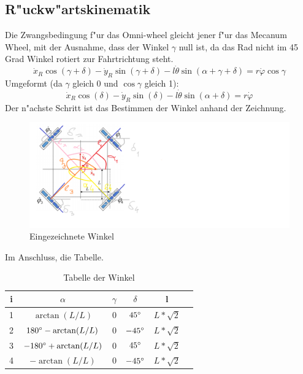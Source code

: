 \documentclass[11pt]{article}
\begin{document}
    \subsection{R"uckw"artskinematik}\label{subsubsec:ruck}
    Die Zwangsbedingung f"ur das Omni-wheel gleicht jener f"ur das Mecanum Wheel, mit der Ausnahme, dass der Winkel $\gamma$ null ist, da das Rad nicht im 45 Grad Winkel rotiert zur Fahrtrichtung steht.
    \begin{equation}
        \dot{x}_{R}\cos\left(  \gamma + \delta \right) - \dot{y}_{R}\sin\left( \gamma + \delta \right) - l \dot{\theta}\sin\left( \alpha + \gamma + \delta \right) = r\dot{\varphi}\cos\gamma\label{eq:zwang}
    \end{equation}
    Umgeformt (da $ \gamma $ gleich 0 und $ \cos\gamma $ gleich 1):
    \begin{equation}
        \dot{x}_{R}\cos\left(\delta \right) - \dot{y}_{R}\sin\left(\delta \right) - l \dot{\theta}\sin\left( \alpha + \delta \right) = r\dot{\varphi}\label{eq:zwangumgf}
    \end{equation}
    Der n"achste Schritt ist das Bestimmen der Winkel anhand der Zeichnung.
    \begin{figure}[H]
        \includegraphics{../images/aufgabeDOriginalWinkelV2.png}
        \caption{Eingezeichnete Winkel}
        \label{fig:winkel}
    \end{figure}
    Im Anschluss, die Tabelle.
    \begin{table}[H]
        \begin{tabular}{|c|c|c|c|c|c}
            \hline
            i & $\alpha$                     & $\gamma$ & $\delta$      & l            \\ \hline
            1 & $\arctan(L/L)$               & 0        & $45\degree$   & $L*\sqrt{2}$ \\ \hline
            2 & $180\degree - \arctan(L/L)$  & 0        & $-45\degree$  & $L*\sqrt{2}$ \\ \hline
            3 & $-180\degree + \arctan(L/L)$ & 0        & $45\degree$ & $L*\sqrt{2}$ \\ \hline
            4 & $- \arctan(L/L)$             & 0        & $-45\degree$  & $L*\sqrt{2}$ \\ \hline
        \end{tabular}\caption{Tabelle der Winkel}\label{tab:winkeltab}
        \label{tab:winkeltabelle}
    \end{table}
\end{document}
